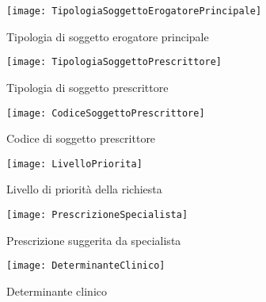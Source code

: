 \documentclass[paper=a4, fontsize=11pt]{scrartcl} %
\numberwithin{equation}{section} %
\numberwithin{figure}{section} %
\numberwithin{table}{section} %
\begin{document}
\begin{figure} [htbp]
\begin{minipage}[t]{0.5\textwidth}
\centering
\texttt{[image: TipologiaSoggettoErogatorePrincipale]}
\caption{Tipologia di soggetto erogatore principale}\label{tipologiaerogatoreprincipale}
\end{minipage}
\begin{minipage} [t]{0.5\textwidth}
\centering
\texttt{[image: TipologiaSoggettoPrescrittore]}
\caption{Tipologia di soggetto prescrittore}\label{tipologiasoggettoprescrittore}
\end{minipage}
\begin{minipage} [t]{0.5\textwidth}
\centering
\texttt{[image: CodiceSoggettoPrescrittore]}
\caption{Codice di soggetto prescrittore}\label{codicesoggettoprescrittore}
\end{minipage}
\begin{minipage} [t]{0.5\textwidth}
\centering
\texttt{[image: LivelloPriorita]}
\caption{Livello di priorità della richiesta}\label{livellopriorita}
\end{minipage}
\begin{minipage} [t]{0.5\textwidth}
\centering
\texttt{[image: PrescrizioneSpecialista]}
\caption{Prescrizione suggerita da specialista}\label{prescrizionespecialista}
\end{minipage}
\begin{minipage}[t]{0.5\textwidth}
\centering
\texttt{[image: DeterminanteClinico]}
\caption{Determinante clinico}\label{determinanteclinico}
\end{minipage}

\end{figure}
\end{document}

